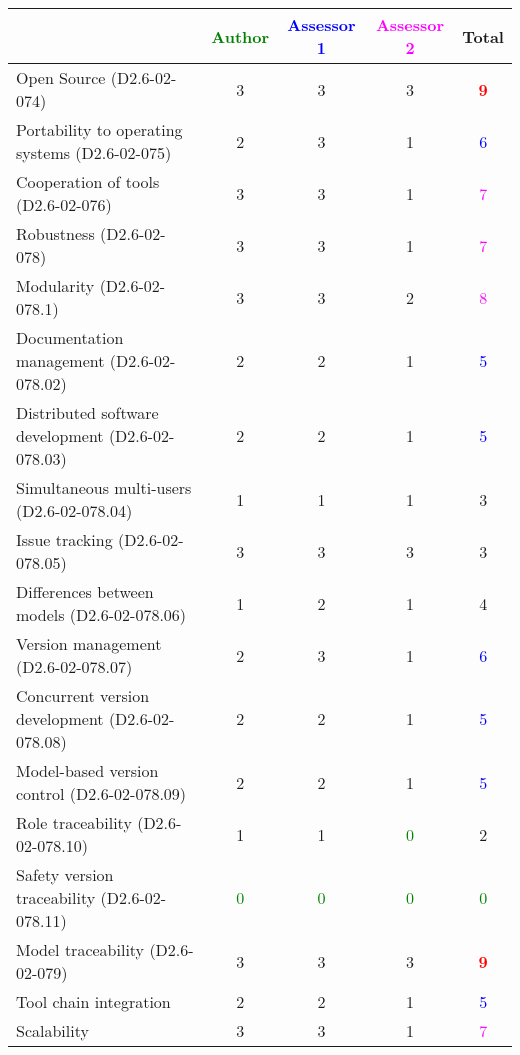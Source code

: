 \begin{tabular}{|l | c | c | c | c|}
\hline
& \textcolor{green}{Author} & \textcolor{blue}{Assessor 1} & \textcolor{magenta}{Assessor 2} & Total \\
\hline 
Open Source (D2.6-02-074) & 3    & 3    & 3    & \textcolor{red}{\textbf{9}}  \\
\hline 
Portability to operating systems (D2.6-02-075) & 2    & 3    & 1    & \textcolor{blue}{6}  \\
\hline
Cooperation of tools (D2.6-02-076) & 3    & 3    & 1    & \textcolor{magenta}{7} \\
\hline
Robustness (D2.6-02-078) & 3    & 3    & 1    & \textcolor{magenta}{7} \\
\hline
Modularity (D2.6-02-078.1) & 3    & 3    & 2    & \textcolor{magenta}{8} \\
\hline
Documentation management (D2.6-02-078.02) & 2    & 2    & 1    & \textcolor{blue}{5} \\
\hline
Distributed software development (D2.6-02-078.03)  & 2    & 2    & 1    & \textcolor{blue}{5} \\
\hline
Simultaneous multi-users (D2.6-02-078.04)   & 1    & 1    & 1    & 3    \\
\hline
Issue tracking (D2.6-02-078.05) & 3    & 3    & 3    & 3    \\
\hline
Differences between models (D2.6-02-078.06) & 1    & 2    & 1    & 4    \\
\hline
Version management (D2.6-02-078.07) & 2    & 3    & 1    & \textcolor{blue}{6} \\
\hline
Concurrent version development (D2.6-02-078.08) & 2    & 2    & 1    & \textcolor{blue}{5} \\
\hline
Model-based version control (D2.6-02-078.09) & 2    & 2    & 1    & \textcolor{blue}{5} \\
\hline
Role traceability (D2.6-02-078.10) & 1    & 1    & \textcolor{green}{0} & 2    \\
\hline
Safety version traceability (D2.6-02-078.11) & \textcolor{green}{0} & \textcolor{green}{0} & \textcolor{green}{0} & \textcolor{green}{0} \\
\hline
Model traceability (D2.6-02-079) & 3    & 3    & 3    & \textcolor{red}{\textbf{9}} \\
\hline
Tool chain integration & 2    & 2    & 1    & \textcolor{blue}{5} \\
\hline
Scalability & 3    & 3    & 1    & \textcolor{magenta}{7} \\
\hline
\end{tabular}

